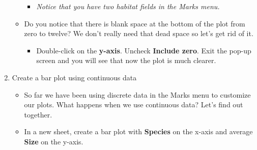 \documentclass[
]{book}
\providecommand{\tightlist}{%
  \setlength{\itemsep}{0pt}\setlength{\parskip}{0pt}}
\begin{document}
\begin{enumerate}
\begin{itemize}
    \begin{itemize}
    \tightlist
    \item
      \emph{Notice that you have two habitat fields in the Marks menu. }
    \end{itemize}
  \item
    Do you notice that there is blank space at the bottom of the plot from zero to twelve? We don't really need that dead space so let's get rid of it.

    \begin{itemize}
    \tightlist
    \item
      Double-click on the \textbf{y-axis}. Uncheck \textbf{Include zero}. Exit the pop-up screen and you will see that now the plot is much clearer.
    \end{itemize}
  \end{itemize}
\item
  Create a bar plot using continuous data

  \begin{itemize}
  \tightlist
  \item
    So far we have been using discrete data in the Marks menu to customize our plots. What happens when we use continuous data? Let's find out together.
  \item
    In a new sheet, create a bar plot with \textbf{Species} on the x-axis and average \textbf{Size} on the y-axis.


\end{itemize}
\end{enumerate}
\end{document}
